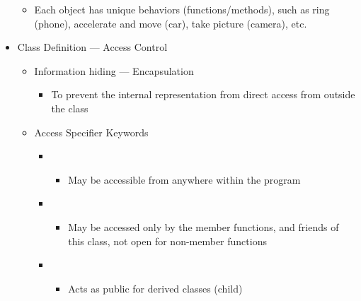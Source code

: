 \begin{itemize}
\begin{itemize}
      \item Each object has unique behaviors (functions/methods), such as ring (phone), accelerate and move (car), take picture (camera), etc.

    \end{itemize}

  \item Class Definition — Access Control

    \begin{itemize}

      \item Information hiding — Encapsulation

        \begin{itemize}

          \item To prevent the internal representation from direct access from outside the class

        \end{itemize}

      \item Access Specifier Keywords

        \begin{itemize}

          \item {}

            \begin{itemize}

              \item May be accessible from anywhere within the program

            \end{itemize}

          \item {}

            \begin{itemize}

              \item May be accessed only by the member functions, and friends of this class, not open for non-member functions

            \end{itemize}

          \item {}

            \begin{itemize}

              \item Acts as public for derived classes (child)


\end{itemize}
\end{itemize}
\end{itemize}
\end{itemize}
